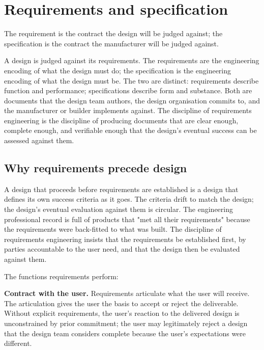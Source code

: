 \chapter{Requirements and specification}
\label{vol11:ch02}

\epigraph{The requirement is the contract the design will be judged against; the specification is the contract the manufacturer will be judged against.}{}


\noindent
A design is judged against its requirements. The requirements are the engineering encoding of what the design must do; the specification is the engineering encoding of what the design must be. The two are distinct: requirements describe function and performance; specifications describe form and substance. Both are documents that the design team authors, the design organisation commits to, and the manufacturer or builder implements against. The discipline of requirements engineering is the discipline of producing documents that are clear enough, complete enough, and verifiable enough that the design's eventual success can be assessed against them.

\section{Why requirements precede design}

A design that proceeds before requirements are established is a design that defines its own success criteria as it goes. The criteria drift to match the design; the design's eventual evaluation against them is circular. The engineering professional record is full of products that "met all their requirements" because the requirements were back-fitted to what was built. The discipline of requirements engineering insists that the requirements be established first, by parties accountable to the user need, and that the design then be evaluated against them.

The functions requirements perform:

\textbf{Contract with the user.} Requirements articulate what the user will receive. The articulation gives the user the basis to accept or reject the deliverable. Without explicit requirements, the user's reaction to the delivered design is unconstrained by prior commitment; the user may legitimately reject a design that the design team considers complete because the user's expectations were different.

